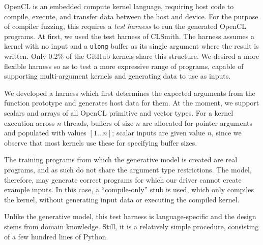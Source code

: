 \begin{table}[t!]
  \centering %
  \caption{%
  OpenCL systems and the number of bug reports submitted to date (22\% of
  which have been fixed, the remainder are pending). For each system, two
  testbeds are created, one with compiler optimizations, the other without.%
  }
  
  \label{tab:platforms}
\end{table}

OpenCL is an embedded compute kernel language, requiring host code to compile,
execute, and transfer data between the host and device. For the purpose of
compiler fuzzing, this requires a \emph{test harness} to run the generated
OpenCL programs. At first, we used the test harness of CLSmith. The harness
assumes a kernel with no input and a \texttt{ulong} buffer as its single
argument where the result is written. Only 0.2\% of the GitHub kernels share
this structure. We desired a more flexible harness so as to test a more
expressive range of programs, capable of supporting multi-argument kernels and
generating data to use as inputs.

We developed a harness which first determines the expected arguments from the
function prototype and generates host data for them. At the moment, we support
scalars and arrays of all OpenCL primitive and vector types. For a kernel
execution across $n$ threads, buffers of size $n$ are allocated for pointer
arguments and populated with values {$[1 \ldots n]$}; scalar inputs are given
value $n$, since we observe that most kernels use these for specifying buffer
sizes.

The training programs from which the generative model is created are real
programs, and as such do not share the argument type restrictions. The model,
therefore, may generate correct programs for which our driver cannot create
example inputs. In this case, a ``compile-only'' stub is used, which only
compiles the kernel, without generating input data or executing the compiled
kernel.

Unlike the generative model, this test harness is language-specific and the
design stems from domain knowledge. Still, it is a relatively simple procedure,
consisting of a few hundred lines of Python.

